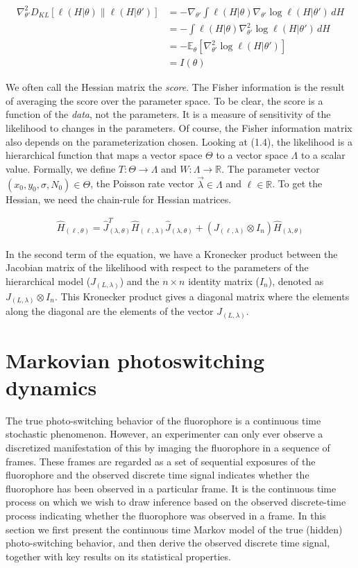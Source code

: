 \documentclass{ucetd}
\begin{document}
\begin{align*}
\nabla^2_{\theta'} D_{KL}[\ell(H|\theta) \parallel \ell(H|\theta')] 
&= - \nabla_{\theta'} \int \ell(H|\theta) \nabla_{\theta'}  \log \ell(H|\theta') \, dH \\ 
&= - \int \ell(H|\theta) \nabla^2_{\theta'}  \log \ell(H|\theta') \, dH \\
&= - \mathbb{E}_{\theta}[\nabla^2_{\theta'} \log \ell(H|\theta')] \\
&= I(\theta)
\end{align*}


We often call the Hessian matrix the \emph{score}. The Fisher information is the result of averaging the score over the parameter space. To be clear, the score is a function of the \emph{data}, not the parameters. It is a measure of sensitivity of the likelihood to changes in the parameters. Of course, the Fisher information matrix also depends on the parameterization chosen. Looking at (1.4), the likelihood is a hierarchical function that maps a vector space $\Theta$ to a vector space $\Lambda$ to a scalar value. Formally, we define $T: \Theta \rightarrow \Lambda$ and $W: \Lambda \rightarrow \mathbb{R}$. The parameter vector $(x_{0},y_{0},\sigma, N_{0})\in \Theta$, the Poisson rate vector $\vec{\lambda} \in \Lambda$ and $\ell \in \mathbb{R}$. To get the Hessian, we need the chain-rule for Hessian matrices.


\begin{align*}
\hat{H}_{(\ell,\theta)} = \hat{J}_{(\lambda,\theta)}^{T} \hat{H}_{(\ell,\lambda)} \hat{J}_{(\lambda,\theta)} + (J_{(\ell,\lambda)}\otimes I_{n})\hat{H}_{(\lambda,\theta)}
\end{align*}

In the second term of the equation, we have a Kronecker product between the Jacobian matrix of the likelihood with respect to the parameters of the hierarchical model ($J_{(L,\lambda)}$) and the $n\times n$ identity matrix ($I_n$), denoted as $J_{(L,\lambda)}\otimes I_n$. This Kronecker product gives a diagonal matrix where the elements along the diagonal are the elements of the vector $J_{(L,\lambda)}$.


\section{Markovian photoswitching dynamics}

The true photo-switching behavior of the fluorophore is a continuous time stochastic phenomenon. However, an experimenter can only ever observe a discretized manifestation of this
by imaging the fluorophore in a sequence of frames. These frames are regarded as a set of
sequential exposures of the fluorophore and the observed discrete time signal indicates whether
the fluorophore has been observed in a particular frame. It is the continuous time process on
which we wish to draw inference based on the observed discrete-time process indicating whether
the fluorophore was observed in a frame. In this section we first present the continuous time
Markov model of the true (hidden) photo-switching behavior, and then derive the observed
discrete time signal, together with key results on its statistical properties.
\end{document}
